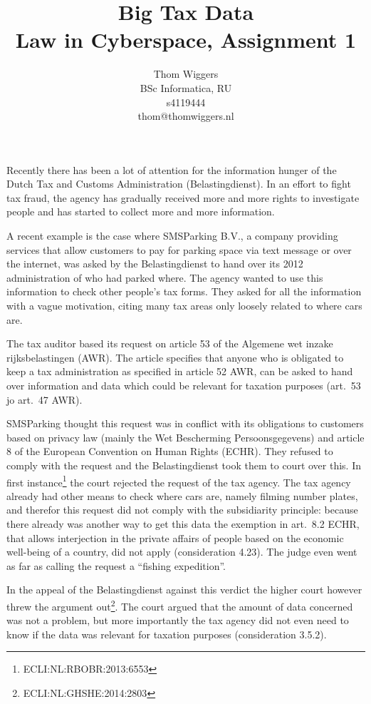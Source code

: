 \documentclass{article}
\author{Thom Wiggers\\ \small BSc Informatica, RU \\ \small s4119444 \\ \small thom@thomwiggers.nl }
\title{Big Tax Data\\ {\large Law in Cyberspace, Assignment 1}}
\begin{document}
\maketitle

Recently there has been a lot of attention for the information hunger of the
Dutch Tax and Customs Administration (Belastingdienst). In an effort to fight
tax fraud, the agency has gradually received more and more rights to investigate
people and has started to collect more and more information.

A recent example is the case where SMSParking B.V., a company providing services
that allow customers to pay for parking space via text message or over the
internet, was asked by the Belastingdienst to hand over its 2012 administration
of who had parked where. The agency wanted to use this information to check
other people's tax forms. They asked for all the information with a vague
motivation, citing many tax areas only loosely related to where cars are.

The tax auditor based its request on article 53 of the Algemene wet inzake
rijksbelastingen (AWR). The article specifies that anyone who is obligated to
keep a tax administration as specified in article 52 AWR, can be asked to hand
over information and data which could be relevant for taxation purposes (art.~53
jo art.~47 AWR). 

SMSParking thought this request was in conflict with its obligations to
customers based on privacy law (mainly the Wet Bescherming Persoonsgegevens) and
article 8 of the European Convention on Human Rights (ECHR). They refused to
comply with the request and the Belastingdienst took them to court over this. In
first instance\footnote{ECLI:NL:RBOBR:2013:6553} the court rejected the request
of the tax agency. The tax agency already had other means to check where cars
are, namely filming number plates, and therefor this request did not comply with
the subsidiarity principle: because there already was another way to get this
data the exemption in art.~8.2 ECHR, that allows interjection in the private
affairs of people based on the economic well-being of a country, did not apply
(consideration 4.23). The judge even went as far as calling the request a
``fishing expedition''.

In the appeal of the Belastingdienst against this verdict the higher court
however threw the argument out\footnote{ECLI:NL:GHSHE:2014:2803}. The court
argued that the amount of data concerned was not a problem, but more importantly
the tax agency did not even need to know if the data was relevant for taxation
purposes (consideration 3.5.2).
\end{document}
